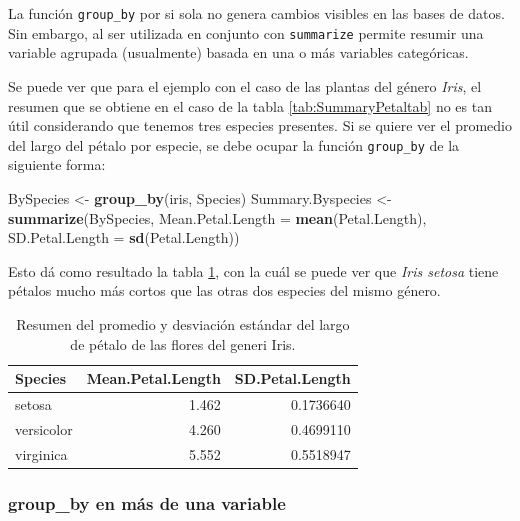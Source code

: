 \documentclass[]{book}
\newenvironment{Shaded}{\begin{snugshade}}{\end{snugshade}}
\newcommand{\DataTypeTok}[1]{\textcolor[rgb]{0.13,0.29,0.53}{#1}}
\newcommand{\KeywordTok}[1]{\textcolor[rgb]{0.13,0.29,0.53}{\textbf{#1}}}
\newcommand{\NormalTok}[1]{#1}
\newcommand{\StringTok}[1]{\textcolor[rgb]{0.31,0.60,0.02}{#1}}
\begin{document}
La función \texttt{group\_by} por si sola no genera cambios visibles en
las bases de datos. Sin embargo, al ser utilizada en conjunto con
\texttt{summarize} permite resumir una variable agrupada (usualmente)
basada en una o más variables categóricas.

Se puede ver que para el ejemplo con el caso de las plantas del género
\emph{Iris}, el resumen que se obtiene en el caso de la tabla
\ref{tab:SummaryPetaltab} no es tan útil considerando que tenemos tres
especies presentes. Si se quiere ver el promedio del largo del pétalo
por especie, se debe ocupar la función \texttt{group\_by} de la
siguiente forma:

\begin{Shaded}
\begin{Highlighting}[]
\NormalTok{BySpecies <-}\StringTok{ }\KeywordTok{group_by}\NormalTok{(iris, Species)}
\NormalTok{Summary.Byspecies <-}\StringTok{ }\KeywordTok{summarize}\NormalTok{(BySpecies, }\DataTypeTok{Mean.Petal.Length =} \KeywordTok{mean}\NormalTok{(Petal.Length), }
    \DataTypeTok{SD.Petal.Length =} \KeywordTok{sd}\NormalTok{(Petal.Length))}
\end{Highlighting}
\end{Shaded}

Esto dá como resultado la tabla \ref{tab:SummaryBySpecies}, con la cuál
se puede ver que \emph{Iris setosa} tiene pétalos mucho más cortos que
las otras dos especies del mismo género.

\begin{table}

\caption{\label{tab:SummaryBySpecies}Resumen del promedio y desviación estándar del largo de pétalo de las flores del generi Iris.}
\centering
\begin{tabular}[t]{lrr}
\toprule
Species & Mean.Petal.Length & SD.Petal.Length\\
\midrule
setosa & 1.462 & 0.1736640\\
versicolor & 4.260 & 0.4699110\\
virginica & 5.552 & 0.5518947\\
\bottomrule
\end{tabular}
\end{table}

\hypertarget{group_by-en-mas-de-una-variable}{%
\subsubsection{group\_by en más de una
variable}\label{group_by-en-mas-de-una-variable}}
\end{document}
